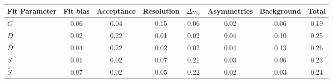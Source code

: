 \begin{tabular}{l  c  c  c  c  c  c  | c }
\hline
\hline
Fit Parameter & Fit bias & Acceptance & Resolution & $\Delta m_{s}$ & Asymmetries & Background &  Total  \\ 
\hline
$C$ & 0.06 & 0.04 & 0.15 & 0.06 & 0.02 & 0.06 & 0.19 \\ 
$D$ & 0.02 & 0.22 & 0.01 & 0.02 & 0.04 & 0.10 & 0.25 \\ 
$\bar{D}$ & 0.04 & 0.22 & 0.02 & 0.02 & 0.04 & 0.13 & 0.26 \\ 
$S$ & 0.01 & 0.02 & 0.07 & 0.21 & 0.03 & 0.06 & 0.23 \\ 
$\bar{S}$ & 0.07 & 0.02 & 0.05 & 0.22 & 0.02 & 0.03 & 0.24 \\ 
\hline
\hline
\end{tabular}
